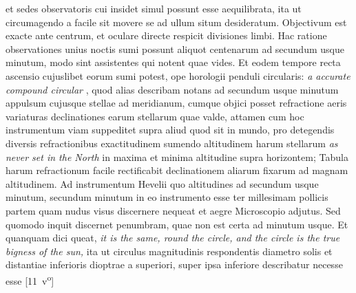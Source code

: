 et sedes observatoris cui insidet simul possunt esse aequilibrata, ita ut circumagendo a  facile sit movere se ad ullum situm desideratum. Objectivum est exacte ante centrum, et oculare\protect{} directe respicit divisiones limbi. Hac ratione observationes unius noctis sumi possunt aliquot centenarum  ad secundum usque minutum, modo sint  assistentes qui notent quae vides. Et eodem tempore recta ascensio cujuslibet eorum sumi potest, ope horologii penduli circularis: \textit{a accurate compound circular }, quod alias describam notans ad secundum usque minutum appulsum cujusque stellae ad meridianum\protect{}, cumque objici posset refractione aeris variaturas declinationes earum stellarum\protect{} quae  valde, attamen cum hoc instrumentum viam suppeditet supra aliud quod sit in mundo, pro detegendis diversis refractionibus  exactitudinem sumendo altitudinem harum stellarum \textit{as never set in the North} in maxima et minima altitudine supra horizontem; Tabula harum refractionum facile rectificabit declinationem aliarum fixarum ad magnam altitudinem. 
\pend 
\count{}
\count{}
\count{}
\pstart Ad instrumentum\protect{} Hevelii\protect{} quo altitudines  ad secundum usque minutum,  secundum minutum in eo instrumento esse ter millesimam pollicis partem quam nudus visus discernere nequeat et aegre Microscopio adjutus. Sed quomodo inquit discernet penumbram\protect{}, quae non est certa ad minutum usque. Et quanquam dici queat, \textit{it is the same, round the circle, and the circle is the true bigness of the sun,} ita ut circulus magnitudinis respondentis diametro solis\protect{} et distantiae inferioris dioptrae\protect{} a superiori, super ipsa inferiore describatur necesse esse [11~v\textsuperscript{o}]